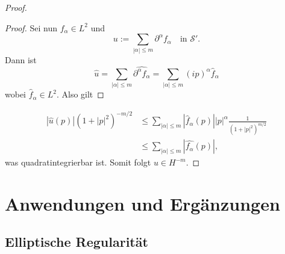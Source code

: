 \documentclass[
paper=a4,
bibtotocnumbered,
liststotocnumbered,
tablecaptionabove,
pointlessnumbers,
twoside,
openright,
10pt
]
{report}
\theoremstyle{definition}
\numberwithin{equation}{chapter}
\begin{document}
\begin{proof}
\begin{proof}
Sei nun $f_{\alpha} \in L^2$ und
\begin{equation}
u:= \sum_{|\alpha|\le m} \partial^\alpha f_\alpha \quad \text{in } \mathcal S'.
\end{equation}
Dann ist
\begin{equation}
\hat u= \sum_{|\alpha|\le m} \widehat{\partial^\alpha f_\alpha} = \sum_{|\alpha|\le m} (ip)^\alpha \hat f_\alpha
\end{equation}
wobei $\hat f_\alpha\in L^2$. Also gilt
\end{proof}
\begin{align}
|\hat u(p)| (1+|p|^2)^{-m/2} &\le \sum_{|\alpha|\le m} |\hat f_\alpha (p)| |p|^{\alpha} \frac{1}{(1+|p|^2)^{m/2}} \\
&\le \sum_{|\alpha|\le m} | \hat{f_\alpha}(p)|,
\end{align}
was quadratintegrierbar ist. Somit folgt $u\in H^{-m}$.
\end{proof}
\chapter{Anwendungen und Ergänzungen}
\section{Elliptische Regularität}
\end{document}
